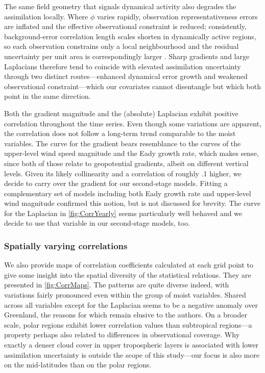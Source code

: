 The same field geometry that signals dynamical activity also degrades
the assimilation locally. Where $\phi$ varies rapidly, observation
representativeness errors are inflated and the effective observational
constraint is reduced; consistently, background-error correlation
length scales shorten in dynamically active regions, so each
observation constrains only a local neighbourhood and the residual
uncertainty per unit area is correspondingly larger
\parencite{leeBackgroundErrorStatistics2020,
    liComparisonTemperatureWind2023}. Sharp gradients and large Laplacians
therefore tend to coincide with elevated assimilation uncertainty
through two distinct routes---enhanced dynamical error growth and
weakened observational constraint---which our covariates cannot
disentangle but which both point in the same direction.

Both the gradient magnitude and the (absolute) Laplacian exhibit positive correlation throughout the time series. Even though some variations are apparent, the correlation does not follow a long-term trend comparable to the moist variables. The curve for the gradient bears resemblance to the curves of the upper-level wind speed magnitude and the Eady growth rate, which makes sense, since both of those relate to geopotential gradients, albeit on different vertical levels. Given its likely collinearity and a correlation of roughly .1 higher, we decide to carry over the gradient for our second-stage models. Fitting a complementary set of models including both Eady growth rate and upper-level wind magnitude confirmed this notion, but is not discussed for brevity. The curve for the Laplacian in \cref{fig:CorrYearly} seems particularly well behaved and we decide to use that variable in our second-stage models, too.

\subsubsection{Spatially varying correlations} \label{sec:EDA_CorrMaps}

We also provide maps of correlation coefficients calculated at each grid point to give some insight into the spatial diversity of the statistical relations. They are presented in \cref{fig:CorrMaps}. The patterns are quite diverse indeed, with variations fairly pronounced even within the group of moist variables. Shared across all variables except for the Laplacian seems to be a negative anomaly over Greenland, the reasons for which remain elusive to the authors. On a broader scale, polar regions exhibit lower correlation values than subtropical regions---a property perhaps also related to differences in observational coverage. Why exactly a denser cloud cover in upper tropospheric layers is associated with lower assimilation uncertainty is outside the scope of this study---our focus is also more on the mid-latitudes than on the polar regions.

